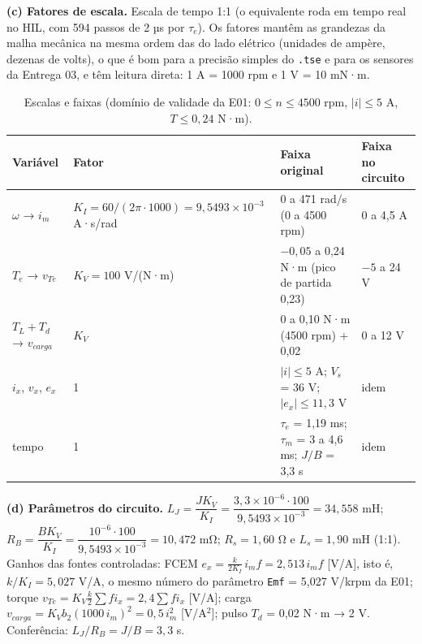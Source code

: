 \documentclass[10pt,a4paper]{article}
\begin{document}
\textbf{(c) Fatores de escala.} Escala de tempo 1:1 (o equivalente roda em tempo real no HIL, com 594 passos de 2 µs por $\tau_e$). Os fatores mantêm as grandezas da malha mecânica na mesma ordem das do lado elétrico (unidades de ampère, dezenas de volts), o que é bom para a precisão simples do \texttt{.tse} e para os sensores da Entrega 03, e têm leitura direta: 1 A = 1000 rpm e 1 V = 10 mN·m.
\begin{table}[!htbp]\centering\footnotesize
\caption{Escalas e faixas (domínio de validade da E01: $0\le n\le4500$ rpm, $|i|\le5$ A, $T\le0{,}24$ N·m).}\label{tab:escala}
\begin{tabular}{llll}\toprule
Variável & Fator & Faixa original & Faixa no circuito\\\midrule
$\omega$ → $i_m$ & $K_I=60/(2\pi\cdot1000)=9{,}5493\times10^{-3}$ A·s/rad & 0 a 471 rad/s (0 a 4500 rpm) & 0 a 4,5 A\\
$T_e$ → $v_{Te}$ & $K_V=100$ V/(N·m) & $-0{,}05$ a 0,24 N·m (pico de partida 0,23) & $-5$ a 24 V\\
$T_L+T_d$ → $v_{carga}$ & $K_V$ & 0 a 0,10 N·m (4500 rpm) + 0,02 & 0 a 12 V\\
$i_x$, $v_x$, $e_x$ & 1 & $|i|\le5$ A; $V_s$ = 36 V; $|e_x|\le11{,}3$ V & idem\\
tempo & 1 & $\tau_e$ = 1,19 ms; $\tau_m$ = 3 a 4,6 ms; $J/B$ = 3,3 s & idem\\\bottomrule
\end{tabular}
\end{table}

\textbf{(d) Parâmetros do circuito.}
$L_J=\dfrac{JK_V}{K_I}=\dfrac{3{,}3\times10^{-6}\cdot100}{9{,}5493\times10^{-3}}=34{,}558$ mH;\;
$R_B=\dfrac{BK_V}{K_I}=\dfrac{10^{-6}\cdot100}{9{,}5493\times10^{-3}}=10{,}472$ mΩ;\;
$R_s=1{,}60$ Ω e $L_s=1{,}90$ mH (1:1).
Ganhos das fontes controladas: FCEM $e_x=\frac{k}{2K_I}\,i_m f=2{,}513\,i_m f$ [V/A], isto é, $k/K_I=5{,}027$ V/A, o mesmo número do parâmetro \texttt{Emf} = 5,027 V/krpm da E01; torque $v_{Te}=K_V\frac k2\sum f i_x=2{,}4\sum f i_x$ [V/A]; carga $v_{carga}=K_Vb_2(1000\,i_m)^2=0{,}5\,i_m^2$ [V/A$^2$]; pulso $T_d$ = 0,02 N·m → 2 V. Conferência: $L_J/R_B=J/B=3{,}3$ s.
\end{document}
